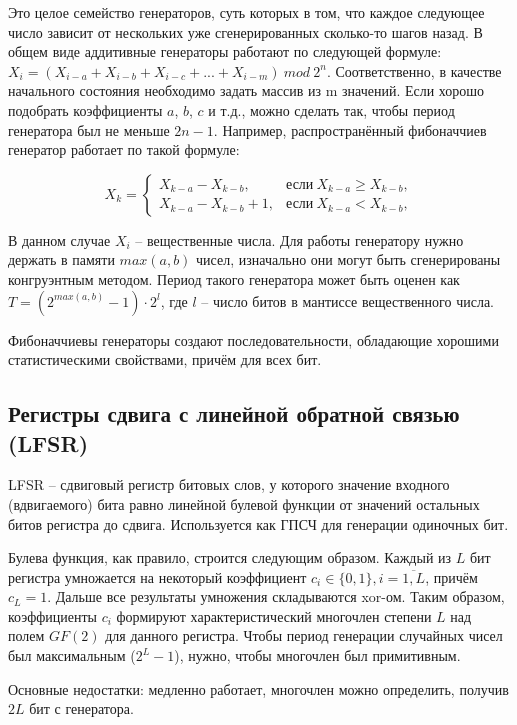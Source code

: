 Это целое семейство генераторов, суть которых в том, что каждое следующее число зависит от нескольких уже сгенерированных сколько-то шагов назад. В общем виде аддитивные генераторы работают по следующей формуле: $X_i = (X_{i - a} + X_{i - b} + X_{i - c} + ... + X_{i - m})\ mod\ 2^n$. Соответственно, в качестве начального состояния необходимо задать массив из m значений. Если хорошо подобрать коэффициенты $a$, $b$, $c$ и т.д., можно сделать так, чтобы период генератора был не меньше $2n - 1$. Например, распространённый фибоначчиев генератор работает по такой формуле:

$$ X_k =
\begin{cases}
	X_{k - a} - X_{k - b}, & \text{если}\ X_{k - a} \geq X_{k - b}, \\
	X_{k - a} - X_{k - b} + 1, & \text{если}\ X_{k - a} < X_{k - b},
\end{cases}
$$

В данном случае $X_i$ -- вещественные числа. Для работы генератору нужно держать в памяти $max(a, b)$ чисел, изначально они могут быть сгенерированы конгруэнтным методом. Период такого генератора может быть оценен как $T = (2^{max(a, b)} - 1) \cdot 2^l$, где $l$ -- число битов в мантиссе вещественного числа.

Фибоначчиевы генераторы создают последовательности, обладающие хорошими статистическими свойствами, причём для всех бит.

\subsection{Регистры сдвига с линейной обратной связью (LFSR)}

LFSR -- сдвиговый регистр битовых слов, у которого значение входного (вдвигаемого) бита равно линейной булевой функции от значений остальных битов регистра до сдвига. Используется как ГПСЧ для генерации одиночных бит. 

Булева функция, как правило, строится следующим образом. Каждый из $L$ бит регистра умножается на некоторый коэффициент $c_i \in \{0, 1\}, i = \overline{1, L}$, причём $c_L = 1$. Дальше все результаты умножения складываются xor-ом. Таким образом, коэффициенты $c_i$ формируют характеристический многочлен степени $L$ над полем $GF(2)$ для данного регистра. Чтобы период генерации случайных чисел был максимальным ($2^L - 1$), нужно, чтобы многочлен был примитивным. 

Основные недостатки: медленно работает, многочлен можно определить, получив $2L$ бит с генератора.

